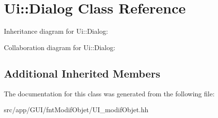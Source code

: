 \hypertarget{classUi_1_1Dialog}{}\section{Ui\+:\+:Dialog Class Reference}
\label{classUi_1_1Dialog}


Inheritance diagram for Ui\+:\+:Dialog\+:


Collaboration diagram for Ui\+:\+:Dialog\+:
\subsection*{Additional Inherited Members}


The documentation for this class was generated from the following file\+:\begin{DoxyCompactItemize}
\item 
src/app/\+G\+U\+I/fnt\+Modif\+Objet/U\+I\+\_\+modif\+Objet.\+hh\end{DoxyCompactItemize}
